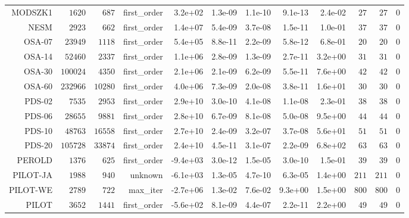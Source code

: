 \begin{longtable}{rrrrrrrrrrrr}
  MODSZK1 & \(  1620\) & \(   687\) & first\_order &  3.2e+02 &  1.3e-09 &  1.1e-10 &  9.1e-13 &  2.4e-02 & \(    27\) & \(    27\) & \(     0\) \\
  NESM & \(  2923\) & \(   662\) & first\_order &  1.4e+07 &  5.4e-09 &  3.7e-08 &  1.5e-11 &  1.0e-01 & \(    37\) & \(    37\) & \(     0\) \\
  OSA-07 & \( 23949\) & \(  1118\) & first\_order &  5.4e+05 &  8.8e-11 &  2.2e-09 &  5.8e-12 &  6.8e-01 & \(    20\) & \(    20\) & \(     0\) \\
  OSA-14 & \( 52460\) & \(  2337\) & first\_order &  1.1e+06 &  2.8e-09 &  1.3e-09 &  2.7e-11 &  3.2e+00 & \(    31\) & \(    31\) & \(     0\) \\
  OSA-30 & \(100024\) & \(  4350\) & first\_order &  2.1e+06 &  2.1e-09 &  6.2e-09 &  5.5e-11 &  7.6e+00 & \(    42\) & \(    42\) & \(     0\) \\
  OSA-60 & \(232966\) & \( 10280\) & first\_order &  4.0e+06 &  7.3e-09 &  2.0e-08 &  3.8e-11 &  1.6e+01 & \(    30\) & \(    30\) & \(     0\) \\
  PDS-02 & \(  7535\) & \(  2953\) & first\_order &  2.9e+10 &  3.0e-10 &  4.1e-08 &  1.1e-08 &  2.3e-01 & \(    38\) & \(    38\) & \(     0\) \\
  PDS-06 & \( 28655\) & \(  9881\) & first\_order &  2.8e+10 &  6.7e-09 &  8.1e-08 &  5.0e-08 &  9.5e+00 & \(    44\) & \(    44\) & \(     0\) \\
  PDS-10 & \( 48763\) & \( 16558\) & first\_order &  2.7e+10 &  2.4e-09 &  3.2e-07 &  3.7e-08 &  5.6e+01 & \(    51\) & \(    51\) & \(     0\) \\
  PDS-20 & \(105728\) & \( 33874\) & first\_order &  2.4e+10 &  4.5e-11 &  3.1e-07 &  2.2e-09 &  6.8e+02 & \(    63\) & \(    63\) & \(     0\) \\
  PEROLD & \(  1376\) & \(   625\) & first\_order & -9.4e+03 &  3.0e-12 &  1.5e-05 &  3.0e-10 &  1.5e-01 & \(    39\) & \(    39\) & \(     0\) \\
  PILOT-JA & \(  1988\) & \(   940\) & unknown & -6.1e+03 &  1.3e-05 &  4.7e-10 &  6.3e-05 &  1.4e+00 & \(   211\) & \(   211\) & \(     0\) \\
  PILOT-WE & \(  2789\) & \(   722\) & max\_iter & -2.7e+06 &  1.3e-02 &  7.6e-02 &  9.3e+00 &  1.5e+00 & \(   800\) & \(   800\) & \(     0\) \\
  PILOT & \(  3652\) & \(  1441\) & first\_order & -5.6e+02 &  8.1e-09 &  4.4e-07 &  2.2e-11 &  2.2e+00 & \(    49\) & \(    49\) & \(     0\) \\

\end{longtable}
